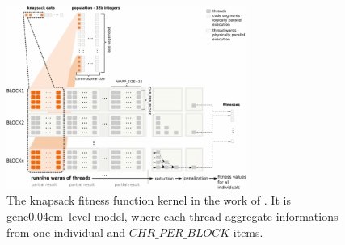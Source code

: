 \begin{figure}[hb!]
    \centering
    \includegraphics[width=0.7\textwidth]{img/KnapsackKernelDesign.png}
    \caption[CUDA evaluation kernel of knapsack problem]{The knapsack fitness function kernel in the work of \citet{GpuIsland}. It is gene\kern0.04em--level model, where each thread aggregate informations from one individual and $CHR\_PER\_BLOCK$ items.}
    \label{fig:knapsackkernel}
\end{figure}

